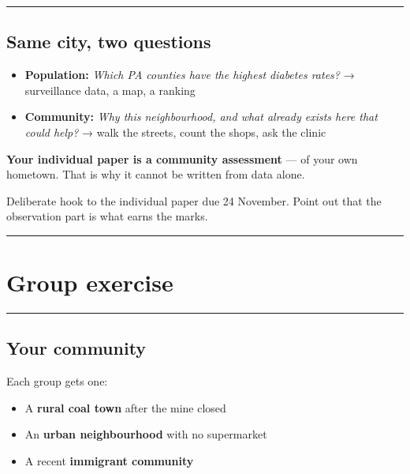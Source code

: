 \documentclass[
  letterpaper,
  DIV=11,
  numbers=noendperiod]{scrartcl}
\providecommand{\tightlist}{%
  \setlength{\itemsep}{0pt}\setlength{\parskip}{0pt}}
\begin{document}
\begin{center}\rule{0.5\linewidth}{0.5pt}\end{center}

\subsection{\texorpdfstring{{\textbf{Same city, two
questions}}}{Same city, two questions}}\label{same-city-two-questions}

\begin{itemize}
\item
  \textbf{Population:} \emph{Which PA counties have the highest diabetes
  rates?} → surveillance data, a map, a ranking
\item
  \textbf{Community:} \emph{Why this neighbourhood, and what already
  exists here that could help?} → walk the streets, count the shops, ask
  the clinic
\end{itemize}

\textbf{Your individual paper is a community assessment} --- of your own
hometown. That is why it cannot be written from data alone.

Deliberate hook to the individual paper due 24 November. Point out that
the observation part is what earns the marks.

\begin{center}\rule{0.5\linewidth}{0.5pt}\end{center}

\section{\texorpdfstring{{\textbf{Group
exercise}}}{Group exercise}}\label{group-exercise}

\begin{center}\rule{0.5\linewidth}{0.5pt}\end{center}

\subsection{\texorpdfstring{{\textbf{Your
community}}}{Your community}}\label{your-community}

Each group gets one:

\begin{itemize}
\tightlist
\item
  A \textbf{rural coal town} after the mine closed
\item
  An \textbf{urban neighbourhood} with no supermarket
\item
  A recent \textbf{immigrant community}
\end{itemize}
\end{document}
